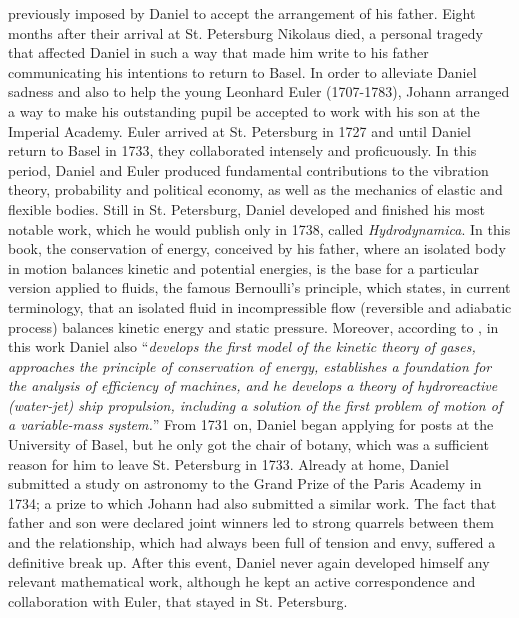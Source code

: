 previously imposed by Daniel to accept the arrangement of his father. Eight months after their arrival at St. Petersburg Nikolaus died, a personal tragedy that affected Daniel in such a way that made him write to his father communicating his intentions to return to Basel. In order to alleviate Daniel sadness and also to help the young Leonhard Euler (1707-1783), Johann arranged a way to make his outstanding pupil be accepted to work with his son at the Imperial Academy. Euler arrived at St. Petersburg in 1727 and until Daniel return to Basel in 1733, they collaborated intensely and proficuously. In this period, Daniel and Euler produced fundamental contributions to the vibration theory, probability and political economy, as well as the mechanics of elastic and flexible bodies. Still in St. Petersburg, Daniel developed and finished his most notable work, which he would publish only in 1738, called \emph{Hydrodynamica}. In this book, the conservation of energy, conceived by his father, where an isolated body in motion balances kinetic and potential energies, is the base for  a particular version applied to fluids, the famous Bernoulli's principle, which states, in current terminology, that an isolated fluid in incompressible flow (reversible and adiabatic process) balances kinetic energy and static pressure. Moreover, according to \cite{mikhailov_2005}, in this work Daniel also ``\emph{develops the first model of the kinetic theory of gases, approaches the principle of conservation of energy, establishes a foundation for the analysis of efficiency of machines, and he develops a theory of hydroreactive (water-jet) ship propulsion, including a solution of the first problem of motion of a variable-mass system.}'' From 1731 on, Daniel began applying for posts at the University of Basel, but he only got the chair of botany, which was a sufficient reason for him to leave St. Petersburg in 1733. Already at home, Daniel submitted a study on astronomy to the Grand Prize of the Paris Academy in 1734; a prize to which Johann had also submitted a similar work. The fact that father and son were declared joint winners led to strong quarrels between them and the relationship, which had always been full of tension and envy, suffered a definitive break up. After this event, Daniel never again developed himself any relevant mathematical work, although he kept an active correspondence and collaboration with Euler, that stayed in St. Petersburg.

